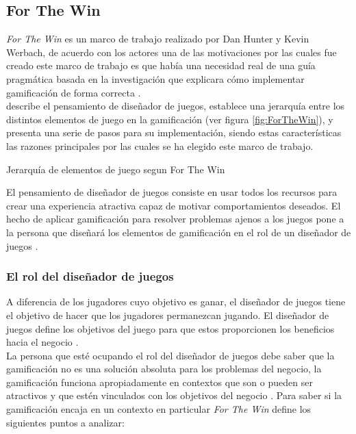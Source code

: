 \subsection{For The Win} \label{sec:ForTheWin}

 {\em For The Win} es un marco de trabajo realizado por Dan Hunter y Kevin Werbach, de acuerdo
 con los actores una de las motivaciones por las cuales fue creado este marco de trabajo es que
 había una necesidad real de una guía pragmática basada en la investigación que explicara cómo
 implementar gamificación de forma correcta \cite{ForTheWin}.\\

  describe el pensamiento de diseñador de juegos, establece una
 jerarquía entre los distintos elementos de juego en la gamificación (ver figura \ref{fig:ForTheWin}),
 y presenta una serie de pasos para su implementación, siendo estas características las razones
 principales por las cuales se ha elegido este marco de trabajo.

        {Jerarquía de elementos de juego segun For The Win}

 \noindent El pensamiento de diseñador de juegos consiste en usar todos los recursos para
 crear una experiencia atractiva capaz de motivar comportamientos deseados. El hecho de
 aplicar gamificación para resolver problemas ajenos a los juegos pone a la persona que
 diseñará los elementos de gamificación en el rol de un diseñador de juegos \cite[p. 29]{ForTheWin}.


\subsubsection{El rol del diseñador de juegos}

 \noindent A diferencia de los jugadores cuyo objetivo es ganar, el diseñador de juegos
 tiene el objetivo de hacer que los jugadores permanezcan jugando. El diseñador de juegos
 define los objetivos del juego para que estos proporcionen los beneficios hacia el negocio
 \cite[p. 29]{ForTheWin}.\\

 \noindent La persona que esté ocupando el rol del diseñador de juegos debe saber que la
 gamificación no es una solución absoluta para los problemas del negocio, la gamificación
 funciona apropiadamente en contextos que son o pueden ser atractivos y que estén vinculados
 con los objetivos del negocio \cite[p. 30]{ForTheWin}. Para saber si la gamificación encaja
 en un contexto en particular {\em For The Win} define los siguientes puntos a analizar:

